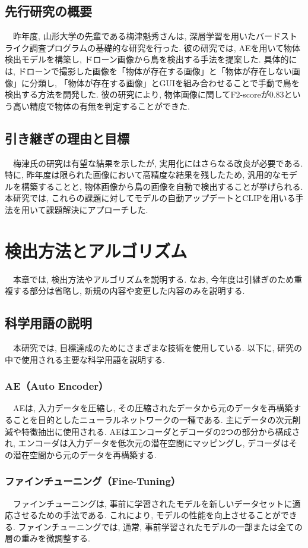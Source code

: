 \documentclass[a4paper, 12pt]{report}
\begin{document}
\subsection{先行研究の概要}
　昨年度, 山形大学の先輩である梅津魁秀さんは, 深層学習を用いたバードストライク調査プログラムの基礎的な研究を行った. 彼の研究では, AEを用いて物体検出モデルを構築し, ドローン画像から鳥を検出する手法を提案した. 具体的には, ドローンで撮影した画像を「物体が存在する画像」と「物体が存在しない画像」に分類し, 「物体が存在する画像」とGUIを組み合わせることで手動で鳥を検出する方法を開発した. 彼の研究により, 物体画像に関してF2-scoreが0.83という高い精度で物体の有無を判定することができた. 

\subsection{引き継ぎの理由と目標}
　梅津氏の研究は有望な結果を示したが, 実用化にはさらなる改良が必要である. 特に, 昨年度は限られた画像において高精度な結果を残したため, 汎用的なモデルを構築することと, 物体画像から鳥の画像を自動で検出することが挙げられる. 本研究では, これらの課題に対してモデルの自動アップデートとCLIPを用いる手法を用いて課題解決にアプローチした. 

\newpage
\section{検出方法とアルゴリズム}
　本章では, 検出方法やアルゴリズムを説明する. なお, 今年度は引継ぎのため重複する部分は省略し, 新規の内容や変更した内容のみを説明する. 

\subsection{科学用語の説明}
　本研究では, 目標達成のためにさまざまな技術を使用している. 以下に, 研究の中で使用される主要な科学用語を説明する. 

\subsubsection{AE（Auto Encoder）}
　AEは, 入力データを圧縮し, その圧縮されたデータから元のデータを再構築することを目的としたニューラルネットワークの一種である. 主にデータの次元削減や特徴抽出に使用される. AEはエンコーダとデコーダの2つの部分から構成され, エンコーダは入力データを低次元の潜在空間にマッピングし, デコーダはその潜在空間から元のデータを再構築する. 

\subsubsection{ファインチューニング（Fine-Tuning）}
　ファインチューニングは, 事前に学習されたモデルを新しいデータセットに適応させるための手法である. これにより, モデルの性能を向上させることができる. ファインチューニングでは, 通常, 事前学習されたモデルの一部または全ての層の重みを微調整する. 
\end{document}
